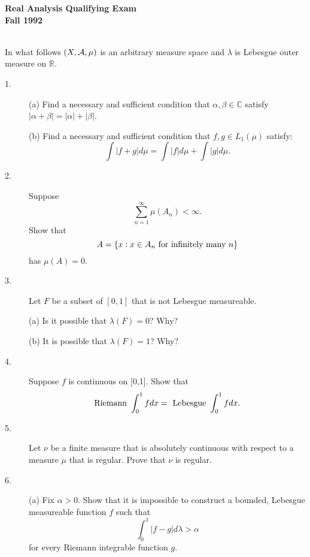 \documentclass{article}
\def\R{\mathbb R}
\def\C{\mathbb C}
\begin{document}






\begin{center}\begin{LARGE}
{\bf Real Analysis Qualifying Exam}\\ 
{\bf Fall 1992}\\ \end{LARGE}
\end{center}
\vspace{0.1in}
\noindent\hrulefill\\

In what follows $(X, {\cal A}, \mu)$ is an arbitrary measure space and
$\lambda$ is Lebesgue outer measure on $\R$.

\begin{description}
\item[1.](a)
Find a necessary and sufficient condition that $\alpha, \beta \in \C$
satisfy $|\alpha + \beta| = |\alpha| + |\beta|$.

\item[\quad] (b)
Find a necessary and sufficient condition that $f, g \in L_1 (\mu)$
satisfy:
$$\int |f+g| d \mu = \int |f| d \mu + \int |g| d \mu.$$

\item[2.]
Suppose
$$\sum^\infty_{n=1} \mu (A_n) < \infty.$$
Show that
$$A=\{x:x \in A_n \hbox{\ for\ } \hbox{infinitely\ } \hbox{many\ } n \}$$
has $\mu(A) =0$.

\item[3.]
Let $F$ be a subset of $[0,1]$ that is not Lebesgue measureable.

\item[\quad] (a)
Is it possible that $\lambda (F) =0$? Why?

\item[\quad] (b)
It is possible that $\lambda (F) =1$? Why?

\item[4.]
Suppose $f$ is continuous on [0,1]. Show that
$$\hbox{Riemann\ } \int^1_0 fdx = \hbox{\ Lebesgue\ } \int^1_0 fdx.$$

\item[5.]
Let $\nu$ be a finite measure that is absolutely continuous with respect to a
measure $\mu$ that is regular. Prove that $\nu$ is regular.

\item[6.] (a)
Fix $\alpha >0$. Show that it is impossible to construct a bounded, Lebesgue
measureable function $f$ such that
$$\int^1_0 |f-g| d \lambda > \alpha$$
for every Riemann integrable function $g$.


\end{description}
\end{document}
